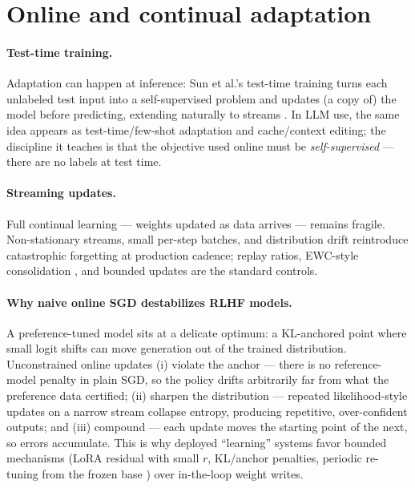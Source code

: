\documentclass[11pt]{article}
\begin{document}
\section{Online and continual adaptation}
\paragraph{Test-time training.} Adaptation can happen at inference: Sun et al.'s test-time training turns each unlabeled test input into a self-supervised problem and updates (a copy of) the model before predicting, extending naturally to streams \cite{sun2020test}. In LLM use, the same idea appears as test-time/few-shot adaptation and cache/context editing; the discipline it teaches is that the objective used online must be \emph{self-supervised} --- there are no labels at test time.
\paragraph{Streaming updates.} Full continual learning --- weights updated as data arrives --- remains fragile. Non-stationary streams, small per-step batches, and distribution drift reintroduce catastrophic forgetting at production cadence; replay ratios, EWC-style consolidation \cite{kirkpatrick2017overcoming}, and bounded updates are the standard controls.
\paragraph{Why naive online SGD destabilizes RLHF models.} A preference-tuned model sits at a delicate optimum: a KL-anchored point where small logit shifts can move generation out of the trained distribution. Unconstrained online updates (i) violate the anchor --- there is no reference-model penalty in plain SGD, so the policy drifts arbitrarily far from what the preference data certified; (ii) sharpen the distribution --- repeated likelihood-style updates on a narrow stream collapse entropy, producing repetitive, over-confident outputs; and (iii) compound --- each update moves the starting point of the next, so errors accumulate. This is why deployed ``learning'' systems favor bounded mechanisms (LoRA residual with small $r$, KL/anchor penalties, periodic re-tuning from the frozen base \cite{rafailov2023direct}) over in-the-loop weight writes.
\end{document}

